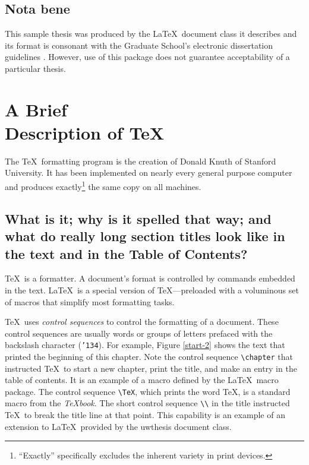 \documentclass [11pt, twoside] {uwthesis}[2012/02/03]
\begin{document}
 
\section{Nota bene}
 
This sample thesis was produced by the \LaTeX\ document class it describes
and its format is consonant with the Graduate School's electronic dissertation guidelines%
\cite{SP}.
However, use of this package does not guarantee acceptability
of a particular thesis.
 
 
 
\chapter{A Brief \texorpdfstring{\\}{} Description of \protect\TeX}
 
The \TeX\ formatting program is the creation of
Donald Knuth of Stanford University.
It has been implemented on nearly every general purpose computer and
produces exactly\footnote{``Exactly'' specifically excludes the
  inherent variety in print devices.}
the same copy on all machines.
 
\section{What is it; why is it spelled that way; 
and what do
really long section titles look like in the text and in the
Table of Contents?}
 
\TeX\ is a formatter.  A document's format is controlled
by commands embedded in the text.
\LaTeX\ is a special version of \TeX---preloaded
with a voluminous set of macros that simplify most
formatting tasks.
 
\TeX\ uses {\it control sequences} to control
the formatting of a document.  These control sequences are usually
words or groups of letters prefaced with the backslash character
({\tt\char'134}).
For example,
Figure \ref{start-2} shows the text that printed the beginning
of this chapter.  Note the control sequence \verb"\chapter" that
instructed \TeX\ to start a new chapter, print the title, and
make an entry in the table of contents.  It is an example
of a macro defined by the \LaTeX\ macro package.
The control sequence \verb"\TeX", which prints the word \TeX,
is a standard macro from the {\it\TeX book}.
The short control sequence \verb"\\" in the title instructed \TeX\ to
break the title line at that point.
This capability is an example of an extension to \LaTeX\
provided by the uwthesis document class.
 
\end{document}
